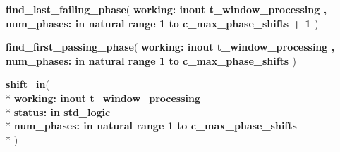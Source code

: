 \begin{DoxyCompactItemize}
{\bfseries {\bfseries \textcolor{vhdlchar}{ }}} {\bf find\+\_\+last\+\_\+failing\+\_\+phase}( {\bfseries \textcolor{vhdlchar}{ }\textcolor{vhdlchar}{working\+: }\textcolor{stringliteral}{} {\bfseries \textcolor{keywordflow}{inout}\textcolor{vhdlchar}{ }{\bfseries {\bf t\+\_\+window\+\_\+processing}} \textcolor{vhdlchar}{ }}}{\bfseries ,\textcolor{vhdlchar}{ }\textcolor{vhdlchar}{num\+\_\+phases\+: }\textcolor{stringliteral}{} {\bfseries \textcolor{keywordflow}{in}\textcolor{vhdlchar}{ }\textcolor{comment}{natural}\textcolor{vhdlchar}{ }\textcolor{vhdlchar}{ }\textcolor{vhdlchar}{ }\textcolor{keywordflow}{range}\textcolor{vhdlchar}{ }\textcolor{vhdlchar}{ } \textcolor{vhdldigit}{1} \textcolor{vhdlchar}{ }\textcolor{keywordflow}{to}\textcolor{vhdlchar}{ }\textcolor{vhdlchar}{ }\textcolor{vhdlchar}{ }\textcolor{vhdlchar}{ }{\bfseries {\bf c\+\_\+max\+\_\+phase\+\_\+shifts}} \textcolor{vhdlchar}{+}\textcolor{vhdlchar}{ } \textcolor{vhdldigit}{1} \textcolor{vhdlchar}{ }}} )
\item 
{\bfseries {\bfseries \textcolor{vhdlchar}{ }}} {\bf find\+\_\+first\+\_\+passing\+\_\+phase}( {\bfseries \textcolor{vhdlchar}{ }\textcolor{vhdlchar}{working\+: }\textcolor{stringliteral}{} {\bfseries \textcolor{keywordflow}{inout}\textcolor{vhdlchar}{ }{\bfseries {\bf t\+\_\+window\+\_\+processing}} \textcolor{vhdlchar}{ }}}{\bfseries ,\textcolor{vhdlchar}{ }\textcolor{vhdlchar}{num\+\_\+phases\+: }\textcolor{stringliteral}{} {\bfseries \textcolor{keywordflow}{in}\textcolor{vhdlchar}{ }\textcolor{comment}{natural}\textcolor{vhdlchar}{ }\textcolor{vhdlchar}{ }\textcolor{vhdlchar}{ }\textcolor{keywordflow}{range}\textcolor{vhdlchar}{ }\textcolor{vhdlchar}{ } \textcolor{vhdldigit}{1} \textcolor{vhdlchar}{ }\textcolor{keywordflow}{to}\textcolor{vhdlchar}{ }\textcolor{vhdlchar}{ }\textcolor{vhdlchar}{ }\textcolor{vhdlchar}{ }{\bfseries {\bf c\+\_\+max\+\_\+phase\+\_\+shifts}} \textcolor{vhdlchar}{ }}} )
\item 
{\bfseries {\bfseries \textcolor{vhdlchar}{ }}} {\bf shift\+\_\+in}( \\*
{\bfseries \textcolor{vhdlchar}{ }\textcolor{vhdlchar}{working\+: }\textcolor{stringliteral}{} {\bfseries \textcolor{keywordflow}{inout}\textcolor{vhdlchar}{ }{\bfseries {\bf t\+\_\+window\+\_\+processing}} \textcolor{vhdlchar}{ }}}\\*
  {\bfseries \textcolor{vhdlchar}{ }\textcolor{vhdlchar}{status\+: }\textcolor{stringliteral}{} {\bfseries \textcolor{keywordflow}{in}\textcolor{vhdlchar}{ }\textcolor{comment}{std\+\_\+logic}\textcolor{vhdlchar}{ }}}\\*
  {\bfseries \textcolor{vhdlchar}{ }\textcolor{vhdlchar}{num\+\_\+phases\+: }\textcolor{stringliteral}{} {\bfseries \textcolor{keywordflow}{in}\textcolor{vhdlchar}{ }\textcolor{comment}{natural}\textcolor{vhdlchar}{ }\textcolor{vhdlchar}{ }\textcolor{vhdlchar}{ }\textcolor{keywordflow}{range}\textcolor{vhdlchar}{ }\textcolor{vhdlchar}{ } \textcolor{vhdldigit}{1} \textcolor{vhdlchar}{ }\textcolor{keywordflow}{to}\textcolor{vhdlchar}{ }\textcolor{vhdlchar}{ }\textcolor{vhdlchar}{ }\textcolor{vhdlchar}{ }{\bfseries {\bf c\+\_\+max\+\_\+phase\+\_\+shifts}} \textcolor{vhdlchar}{ }}}\\*
   )
\end{DoxyCompactItemize}
